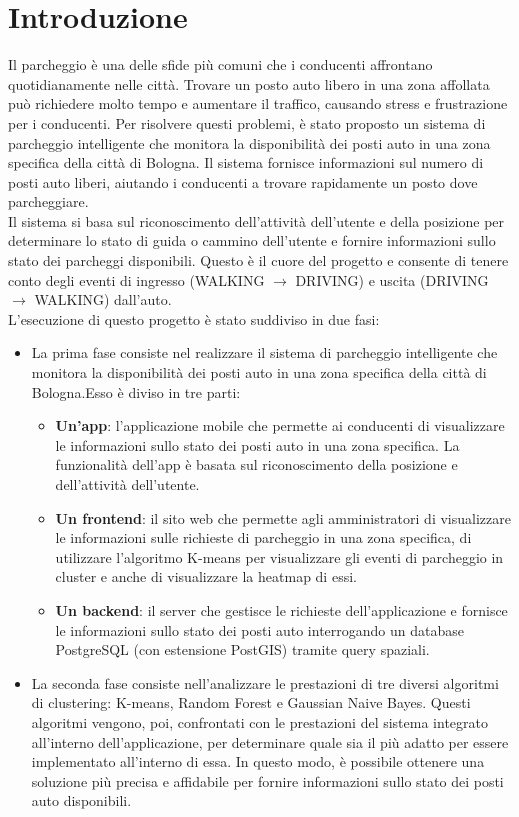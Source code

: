 \documentclass[../../Report.tex]{subfiles}
\begin{document}
    \chapter{Introduzione}
    Il parcheggio è una delle sfide più comuni che i conducenti affrontano quotidianamente nelle città. Trovare un posto auto libero in una zona affollata può richiedere molto tempo e aumentare il traffico, causando stress e frustrazione per i conducenti. Per risolvere questi problemi, è stato proposto un sistema di parcheggio intelligente che monitora la disponibilità dei posti auto in una zona specifica della città di Bologna. Il sistema fornisce informazioni sul numero di posti auto liberi, aiutando i conducenti a trovare rapidamente un posto dove parcheggiare.\\
    Il sistema si basa sul riconoscimento dell'attività dell'utente e della posizione per determinare lo stato di guida o cammino dell'utente e fornire informazioni sullo stato dei parcheggi disponibili. Questo è il cuore del progetto e consente di tenere conto degli eventi di ingresso (WALKING $\rightarrow$ DRIVING) e uscita (DRIVING $\rightarrow$ WALKING) dall'auto.\\
    L'esecuzione di questo progetto è stato suddiviso in due fasi:
    \begin{itemize}
        \item La prima fase consiste nel realizzare il sistema di parcheggio intelligente che monitora la disponibilità dei posti auto in una zona specifica della città di Bologna.Esso è diviso in tre parti:
        \begin{itemize}
            \item \textbf{Un'app}: l'applicazione mobile che permette ai conducenti di visualizzare le informazioni sullo stato dei posti auto in una zona specifica. La funzionalità dell'app è basata sul riconoscimento della posizione e dell'attività dell'utente.
            \item \textbf{Un frontend}: il sito web che permette agli amministratori di visualizzare le informazioni sulle richieste di parcheggio in una zona specifica, di utilizzare l'algoritmo K-means per visualizzare gli eventi di parcheggio in cluster e anche di visualizzare la heatmap di essi.
            \item \textbf{Un backend}: il server che gestisce le richieste dell'applicazione e fornisce le informazioni sullo stato dei posti auto interrogando un database PostgreSQL (con estensione PostGIS) tramite query spaziali.
        \end{itemize}
        \item La seconda fase consiste nell'analizzare le prestazioni di tre diversi algoritmi di clustering: K-means, Random Forest e Gaussian Naive Bayes. Questi algoritmi vengono, poi, confrontati con le prestazioni del sistema integrato all'interno dell'applicazione, per determinare quale sia il più adatto per essere implementato all'interno di essa. In questo modo, è possibile ottenere una soluzione più precisa e affidabile per fornire informazioni sullo stato dei posti auto disponibili. 
    \end{itemize}
\end{document}
